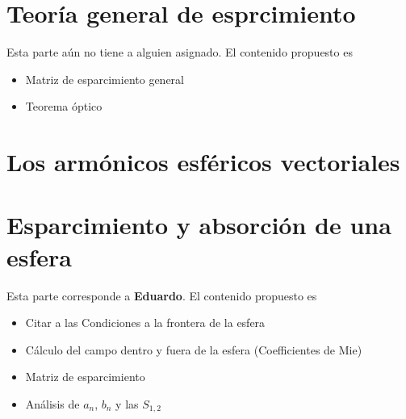 \documentclass[12pts,a4paper]{book}
\begin{document}
\chapter{Teoría general de esprcimiento}
\label{ch:EsparcimientoGral} %

Esta parte aún no tiene a alguien asignado. El contenido propuesto es

\begin{itemize}
 \item Matriz de esparcimiento general
 \item Teorema óptico
\end{itemize}



\chapter{Los armónicos esféricos vectoriales}
\label{ch:AEV} 







\chapter{Esparcimiento y absorción de una esfera}
\label{ch:AEV} %
Esta parte corresponde a \textbf{Eduardo}. El contenido propuesto es

\begin{itemize}
 \item Citar a las Condiciones a la frontera de la esfera
 \item Cálculo del campo dentro y fuera de la esfera (Coefficientes de Mie)
 \item Matriz de esparcimiento
 \item Análisis de $a_n$, $b_n$ y las $S_{1,2}$
\end{itemize}
\end{document}
